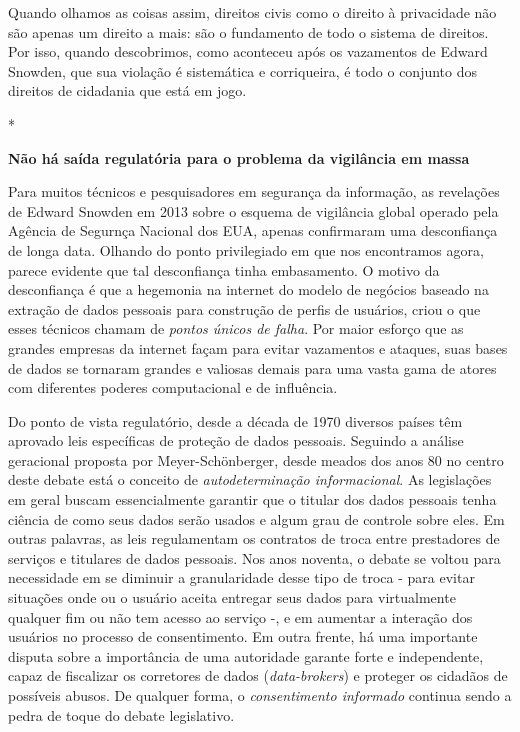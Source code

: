 Quando olhamos as coisas assim, direitos civis como o direito à
privacidade não são apenas um direito a mais: são o fundamento de todo o
sistema de direitos. Por isso, quando descobrimos, como aconteceu após
os vazamentos de Edward Snowden, que sua violação é sistemática e
corriqueira, é todo o conjunto dos direitos de cidadania que está em
jogo.

*

\textbf{Não há saída regulatória para o problema da vigilância em massa}

Para muitos técnicos e pesquisadores em segurança da informação, as
revelações de Edward Snowden em 2013 sobre o esquema de vigilância
global operado pela Agência de Segurnça Nacional dos EUA, apenas
confirmaram uma desconfiança de longa data. Olhando do ponto
privilegiado em que nos encontramos agora, parece evidente que tal
desconfiança tinha embasamento. O motivo da desconfiança é que a
hegemonia na internet do modelo de negócios baseado na extração de dados
pessoais para construção de perfis de usuários, criou o que esses
técnicos chamam de \emph{pontos únicos de falha}. Por maior esforço que
as grandes empresas da internet façam para evitar vazamentos e ataques,
suas bases de dados se tornaram grandes e valiosas demais para uma vasta
gama de atores com diferentes poderes computacional e de influência.

Do ponto de vista regulatório, desde a década de 1970 diversos países
têm aprovado leis específicas de proteção de dados pessoais. Seguindo a
análise geracional proposta por Meyer-Schönberger, desde meados dos anos
80 no centro deste debate está o conceito de \emph{autodeterminação
informacional}. As legislações em geral buscam essencialmente garantir
que o titular dos dados pessoais tenha ciência de como seus dados serão
usados e algum grau de controle sobre eles. Em outras palavras, as leis
regulamentam os contratos de troca entre prestadores de serviços e
titulares de dados pessoais. Nos anos noventa, o debate se voltou para
necessidade em se diminuir a granularidade desse tipo de troca - para
evitar situações onde ou o usuário aceita entregar seus dados para
virtualmente qualquer fim ou não tem acesso ao serviço -, e em aumentar
a interação dos usuários no processo de consentimento. Em outra frente,
há uma importante disputa sobre a importância de uma autoridade garante
forte e independente, capaz de fiscalizar os corretores de dados
(\emph{data-brokers}) e proteger os cidadãos de possíveis abusos. De
qualquer forma, o \emph{consentimento informado} continua sendo a pedra
de toque do debate legislativo.

